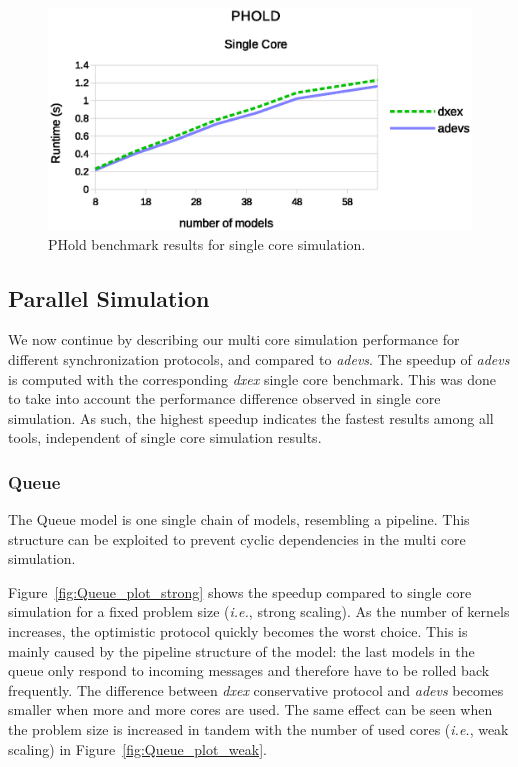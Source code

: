 \begin{figure}
	\center
	\includegraphics[width=\columnwidth]{fig/phold_sequential.eps}
	\caption{PHold benchmark results for single core simulation.}
	\label{fig:Phold_benchmark}
\end{figure}

\subsection{Parallel Simulation}
We now continue by describing our multi core simulation performance for different synchronization protocols, and compared to \textit{adevs}.
The speedup of \textit{adevs} is computed with the corresponding \textit{dxex} single core benchmark.
This was done to take into account the performance difference observed in single core simulation.
As such, the highest speedup indicates the fastest results among all tools, independent of single core simulation results.

\subsubsection{Queue}
The Queue model is one single chain of models, resembling a pipeline.
This structure can be exploited to prevent cyclic dependencies in the multi core simulation.

Figure~\ref{fig:Queue_plot_strong} shows the speedup compared to single core simulation for a fixed problem size (\textit{i.e.}, strong scaling).
As the number of kernels increases, the optimistic protocol quickly becomes the worst choice.
This is mainly caused by the pipeline structure of the model: the last models in the queue only respond to incoming messages and therefore have to be rolled back frequently.
The difference between \textit{dxex} conservative protocol and \textit{adevs} becomes smaller when more and more cores are used.
The same effect can be seen when the problem size is increased in tandem with the number of used cores (\textit{i.e.}, weak scaling) in Figure~\ref{fig:Queue_plot_weak}.

